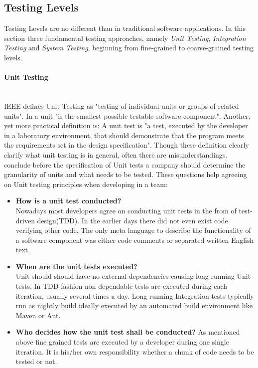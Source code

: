 \documentclass[12pt, notitlepage]{article}
\begin{document}
\subsection{Testing Levels}
Testing Levels are no different than in traditional software applications. 
In this section three fundamental testing approaches, namely \textit{Unit Testing}, \textit{Integration Testing} and 
\textit{System Testing}, beginning from fine-grained to coarse-grained testing levels. 

\paragraph{Unit Testing} ~\\
IEEE defines Unit Testing as\cite{ieee-definition} "testing of individual units or groups of related units". In \cite{sw-testing-quality-assurance}
a unit "is the smallest possible testable software component". Another, yet more practical definition is\cite{practical-unit-testing-definition}:
A unit test is "a test, executed by the developer in a laboratory environment, that should demonstrate that the program meets the requirements set in the design specification". Though these definition clearly clarify what unit testing is in general, often there are misunderstandings. \cite{unit-testing-survey} conclude
before the specification of Unit tests a company should determine the granularity of units and what needs to be tested.
These questions help agreeing on Unit testing principles when developing in a team:\\
\begin{itemize}
	\item \textbf{How is a unit test conducted?}\\
	Nowadays most developers agree on conducting unit tests in the from of test-driven design(TDD)\cite{beck-tdd}. 
	In the earlier days there did not even exist code verifying other code. The only meta language to describe the functionality of a software component was either
	code comments or separated written English text.
	\item \textbf{When are the unit tests executed?}\\
	Unit should should have no external dependencies causing long running Unit tests. In TDD fashion non dependable tests are executed during each iteration,
	usually several times a day. Long running Integration tests typically run as nightly build ideally executed by an automated build environment like
	Maven\cite{maven} or Ant\cite{ant}.
	\item \textbf{Who decides how the unit test shall be conducted?}
	As mentioned above fine grained tests are executed by a developer during one single iteration. It is his/her own responsibility whether a chunk of code needs to
	be tested or not.
\end{itemize}
\end{document}
